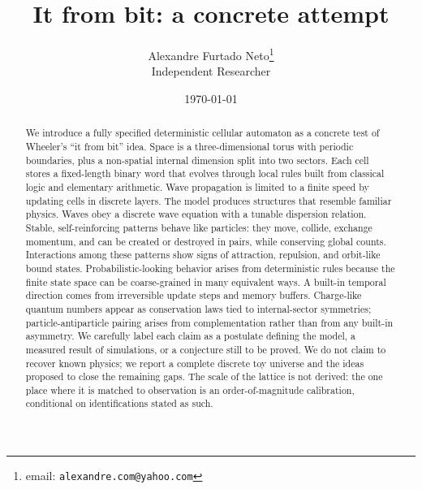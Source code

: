 \documentclass[a4paper]{article}
\begin{document}
\title{It from bit: a concrete attempt}
\author{Alexandre Furtado Neto\thanks{email: \texttt{alexandre.com@yahoo.com}}\\
Independent Researcher}
\date{\today}
\maketitle
\begin{abstract}
\sloppy
We introduce a fully specified deterministic cellular automaton as a concrete test of Wheeler's ``it from bit'' idea. Space is a three-dimensional torus with periodic boundaries, plus a non-spatial internal dimension split into two sectors. Each cell stores a fixed-length binary word that evolves through local rules built from classical logic and elementary arithmetic. Wave propagation is limited to a finite speed by updating cells in discrete layers.
The model produces structures that resemble familiar physics. Waves obey a discrete wave equation with a tunable dispersion relation. Stable, self-reinforcing patterns behave like particles: they move, collide, exchange momentum, and can be created or destroyed in pairs, while conserving global counts. Interactions among these patterns show signs of attraction, repulsion, and orbit-like bound states. Probabilistic-looking behavior arises from deterministic rules because the finite state space can be coarse-grained in many equivalent ways. A built-in temporal direction comes from irreversible update steps and memory buffers. Charge-like quantum numbers appear as conservation laws tied to internal-sector symmetries; particle-antiparticle pairing arises from complementation rather than from any built-in asymmetry.
We carefully label each claim as a postulate defining the model, a measured result of simulations, or a conjecture still to be proved. We do not claim to recover known physics; we report a complete discrete toy universe and the ideas proposed to close the remaining gaps. The scale of the lattice is not derived: the one place where it is matched to observation is an order-of-magnitude calibration, conditional on identifications stated as such.
\medskip{}
\end{abstract}
\end{document}
